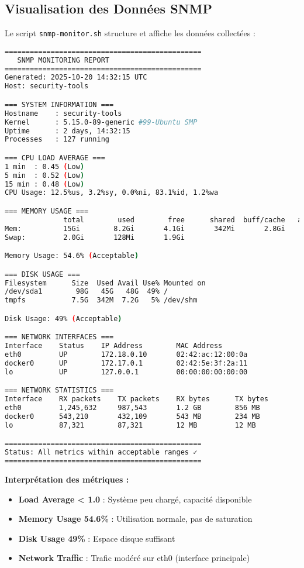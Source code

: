\documentclass[11pt,a4paper]{report}
\begin{document}
\subsection{Visualisation des Données SNMP}

Le script \texttt{snmp-monitor.sh} structure et affiche les données collectées :

\begin{lstlisting}[language=bash, caption=Structure du Rapport SNMP Généré, basicstyle=\ttfamily\tiny]
===============================================
   SNMP MONITORING REPORT
===============================================
Generated: 2025-10-20 14:32:15 UTC
Host: security-tools

=== SYSTEM INFORMATION ===
Hostname    : security-tools
Kernel      : 5.15.0-89-generic #99-Ubuntu SMP
Uptime      : 2 days, 14:32:15
Processes   : 127 running

=== CPU LOAD AVERAGE ===
1 min  : 0.45 (Low)
5 min  : 0.52 (Low)
15 min : 0.48 (Low)
CPU Usage: 12.5%us, 3.2%sy, 0.0%ni, 83.1%id, 1.2%wa

=== MEMORY USAGE ===
              total        used        free      shared  buff/cache   available
Mem:          15Gi        8.2Gi       4.1Gi       342Mi       2.8Gi       6.5Gi
Swap:         2.0Gi       128Mi       1.9Gi

Memory Usage: 54.6% (Acceptable)

=== DISK USAGE ===
Filesystem      Size  Used Avail Use% Mounted on
/dev/sda1        98G   45G   48G  49% /
tmpfs           7.5G  342M  7.2G   5% /dev/shm

Disk Usage: 49% (Acceptable)

=== NETWORK INTERFACES ===
Interface    Status    IP Address        MAC Address
eth0         UP        172.18.0.10       02:42:ac:12:00:0a
docker0      UP        172.17.0.1        02:42:5e:3f:2a:11
lo           UP        127.0.0.1         00:00:00:00:00:00

=== NETWORK STATISTICS ===
Interface    RX packets    TX packets    RX bytes      TX bytes
eth0         1,245,632     987,543       1.2 GB        856 MB
docker0      543,210       432,109       543 MB        234 MB
lo           87,321        87,321        12 MB         12 MB

===============================================
Status: All metrics within acceptable ranges ✓
===============================================
\end{lstlisting}

\textbf{Interprétation des métriques :}
\begin{itemize}
    \item \textbf{Load Average < 1.0} : Système peu chargé, capacité disponible
    \item \textbf{Memory Usage 54.6\%} : Utilisation normale, pas de saturation
    \item \textbf{Disk Usage 49\%} : Espace disque suffisant
    \item \textbf{Network Traffic} : Trafic modéré sur eth0 (interface principale)
\end{itemize}
\end{document}
